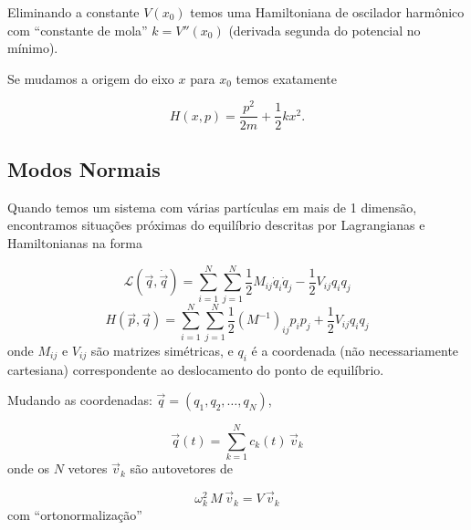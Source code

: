 Eliminando a constante $V(x_0)$ temos uma Hamiltoniana de oscilador harmônico com ``constante de mola'' $k = V''(x_0)$ (derivada segunda do potencial no mínimo).

Se mudamos a origem do eixo $x$ para $x_0$ temos exatamente

\begin{equation}
    H(x,p) = \frac{p^2}{2m} + \frac{1}{2}kx^2 .
\label{eq:aula16_H_apos_translacao}
\end{equation}


\subsection*{Modos Normais}

Quando temos um sistema com várias partículas em mais de 1 dimensão, encontramos situações próximas do equilíbrio descritas por Lagrangianas e Hamiltonianas na forma

\begin{equation}
    \mathcal{L}(\vec{q}, \dot{\vec{q}}) = \sum_{i=1}^{N}\sum_{j=1}^{N} \frac{1}{2}M_{ij}\dot{q}_i\dot{q}_j - \frac{1}{2}V_{ij}q_i q_j
\label{eq:aula16_lagrangiana_modos}
\end{equation}
\begin{equation}
    H(\vec{p}, \vec{q}) = \sum_{i=1}^{N}\sum_{j=1}^{N} \frac{1}{2}(M^{-1})_{ij}p_i p_j + \frac{1}{2}V_{ij}q_i q_j
\label{eq:aula16_hamiltoniana_modos}
\end{equation}
onde $M_{ij}$ e $V_{ij}$ são matrizes simétricas, e $q_i$ é a coordenada (não necessariamente cartesiana) correspondente ao deslocamento do ponto de equilíbrio.

Mudando as coordenadas: $\vec{q} = (q_1, q_2, \dots, q_N)$,

\begin{equation}
    \vec{q}(t) = \sum_{k=1}^{N} c_k(t)\,\vec{v}_k
\label{eq:aula16_mudanca_coordenadas}
\end{equation}
onde os $N$ vetores $\vec{v}_k$ são autovetores de

\begin{equation}
    \omega_k^2 \, M \, \vec{v}_k = V\, \vec{v}_k
\label{eq:aula16_autovetores}
\end{equation}
com ``ortonormalização''

